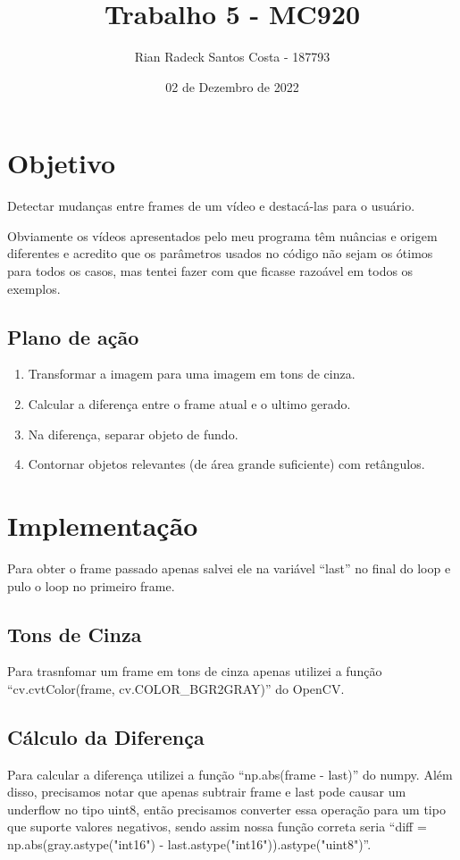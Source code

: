 \documentclass[12pt, letterpaper]{article}
\title{Trabalho 5 - MC920}
\author{Rian Radeck Santos Costa - 187793}
\date{02 de Dezembro de 2022}
\begin{document}
\maketitle
\newpage

\section{Objetivo}
		Detectar mudanças entre frames de um vídeo e destacá-las para o usuário. 

		Obviamente os vídeos apresentados pelo meu programa têm nuâncias e origem diferentes e acredito que os parâmetros usados no código não sejam os ótimos para todos os casos, mas tentei fazer com que ficasse razoável em todos os exemplos.
		\subsection{Plano de ação}
		\begin{enumerate}
			\item{Transformar a imagem para uma imagem em tons de cinza.}
			\item{Calcular a diferença entre o frame atual e o ultimo gerado.}
			\item{Na diferença, separar objeto de fundo.}
			\item{Contornar objetos relevantes (de área grande suficiente) com retângulos.}
		\end{enumerate}

\section{Implementação}
	Para obter o frame passado apenas salvei ele na variável ``last'' no final do loop e pulo o loop no primeiro frame.
	\subsection{Tons de Cinza}
		Para trasnfomar um frame em tons de cinza apenas utilizei a função ``cv.cvtColor(frame, cv.COLOR\_BGR2GRAY)'' do OpenCV.
	\subsection{Cálculo da Diferença}
		Para calcular a diferença utilizei a função ``np.abs(frame - last)'' do numpy. Além disso, precisamos notar que apenas subtrair frame e last pode causar um underflow no tipo uint8, então precisamos converter essa operação para um tipo que suporte valores negativos, sendo assim nossa função correta seria ``diff = np.abs(gray.astype("int16") - last.astype("int16")).astype("uint8")''.
\end{document}
